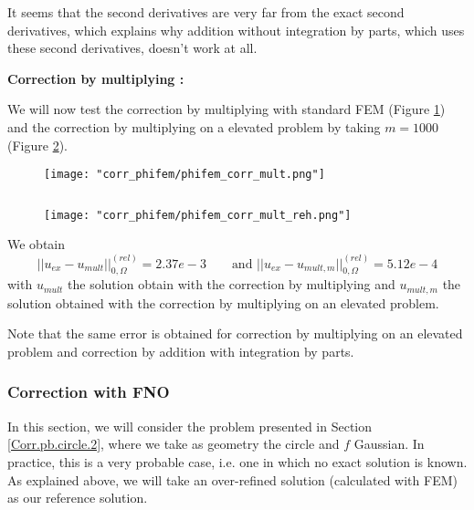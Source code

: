 It seems that the second derivatives are very far from the exact second derivatives, which explains why addition without integration by parts, which uses these second derivatives, doesn't work at all.

\textbf{Correction by multiplying :}

We will now test the correction by multiplying with standard FEM (Figure \ref{corr_phifem_phifem_corr_mult}) and the correction by multiplying on a elevated problem by taking $m=1000$ (Figure \ref{corr_phifem_phifem_corr_mult_reh}).

\begin{minipage}{0.48\linewidth}
	\begin{figure}[H]
		\centering
		\texttt{[image: "corr\_phifem/phifem\_corr\_mult.png"]}
		\label{corr_phifem_phifem_corr_mult}
	\end{figure} 
\end{minipage} $\qquad$
\begin{minipage}{0.48\linewidth}
	\begin{figure}[H]
		\centering
		\texttt{[image: "corr\_phifem/phifem\_corr\_mult\_reh.png"]}
		\label{corr_phifem_phifem_corr_mult_reh}
	\end{figure} 
\end{minipage}

We obtain
\begin{equation*}
	||u_{ex}-u_{mult}||_{0,\Omega}^{(rel)}=2.37e-3 \qquad \text{and } ||u_{ex}-u_{mult,m}||_{0,\Omega}^{(rel)}=5.12e-4
\end{equation*}
with $u_{mult}$ the solution obtain with the correction by multiplying and $u_{mult,m}$ the solution obtained with the correction by multiplying on an elevated problem.

\begin{Rem}
	Note that the same error is obtained for correction by multiplying on an elevated problem and correction by addition with integration by parts.
\end{Rem}

\subsubsection{Correction with FNO} \label{Corr.results.FNO}

In this section, we will consider the problem presented in Section \ref{Corr.pb.circle.2}, where we take as geometry the circle and $f$ Gaussian. In practice, this is a very probable case, i.e. one in which no exact solution is known. As explained above, we will take an over-refined solution (calculated with FEM) as our reference solution. 

